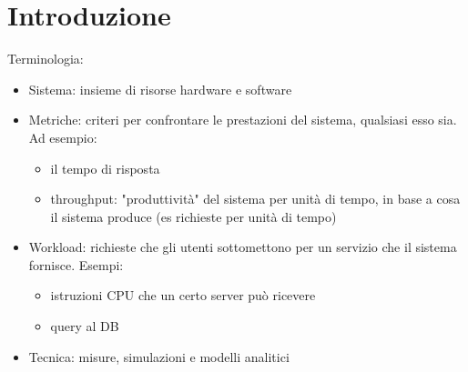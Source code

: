 \documentclass{article}
\begin{document}
\Large
\tableofcontents
\newpage
\section{Introduzione}
Terminologia:
\begin{itemize}
\item Sistema: insieme di risorse hardware e software
\item Metriche: criteri per confrontare le prestazioni del sistema, qualsiasi esso sia. Ad esempio:
\begin{itemize}
\item il tempo di risposta
\item throughput: "produttività" del sistema per unità di tempo, in base a cosa il sistema produce (es richieste per unità di tempo)
\end{itemize}
\item Workload: richieste che gli utenti sottomettono per un servizio che il sistema fornisce. Esempi:
\begin{itemize}
\item istruzioni CPU che un certo server può ricevere
\item query al DB
\end{itemize}
\item Tecnica: misure, simulazioni e modelli analitici
\end{itemize}
\end{document}
